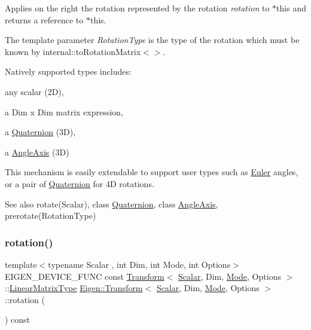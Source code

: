 Applies on the right the rotation represented by the rotation {\itshape rotation} to {\ttfamily $\ast$this} and returns a reference to {\ttfamily $\ast$this}.

The template parameter {\itshape Rotation\+Type} is the type of the rotation which must be known by internal\+::to\+Rotation\+Matrix$<$$>$.

Natively supported types includes\+:
\begin{DoxyItemize}
\item any scalar (2D),
\item a Dim x Dim matrix expression,
\item a \mbox{\hyperlink{class_eigen_1_1_quaternion}{Quaternion}} (3D),
\item a \mbox{\hyperlink{class_eigen_1_1_angle_axis}{Angle\+Axis}} (3D)
\end{DoxyItemize}

This mechanism is easily extendable to support user types such as \mbox{\hyperlink{class_euler}{Euler}} angles, or a pair of \mbox{\hyperlink{class_eigen_1_1_quaternion}{Quaternion}} for 4D rotations.

\begin{DoxySeeAlso}{See also}
rotate(\+Scalar), class \mbox{\hyperlink{class_eigen_1_1_quaternion}{Quaternion}}, class \mbox{\hyperlink{class_eigen_1_1_angle_axis}{Angle\+Axis}}, prerotate(\+Rotation\+Type) 
\end{DoxySeeAlso}
\mbox{\label{class_eigen_1_1_transform_a87eb429e076e2c15a1bfbe99b43ae07c}} 
\subsubsection{\texorpdfstring{rotation()}{rotation()}}
{\footnotesize\ttfamily template$<$typename Scalar , int Dim, int Mode, int Options$>$ \\
E\+I\+G\+E\+N\+\_\+\+D\+E\+V\+I\+C\+E\+\_\+\+F\+U\+NC const \mbox{\hyperlink{class_eigen_1_1_transform}{Transform}}$<$ \mbox{\hyperlink{class_eigen_1_1_transform_a4e69ced9d651745b8ed4eda46f41795d}{Scalar}}, Dim, \mbox{\hyperlink{struct_mode}{Mode}}, Options $>$\+::\mbox{\hyperlink{class_eigen_1_1_transform_a48138c0370e55371b95946c90d69e25c}{Linear\+Matrix\+Type}} \mbox{\hyperlink{class_eigen_1_1_transform}{Eigen\+::\+Transform}}$<$ \mbox{\hyperlink{class_eigen_1_1_transform_a4e69ced9d651745b8ed4eda46f41795d}{Scalar}}, Dim, \mbox{\hyperlink{struct_mode}{Mode}}, Options $>$\+::rotation (\begin{DoxyParamCaption}{ }\end{DoxyParamCaption}) const}


